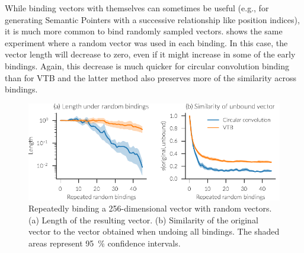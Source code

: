 While binding vectors with themselves can sometimes be useful (e.g., for generating Semantic Pointers with a successive relationship like position indices), it is much more common to bind randomly sampled vectors.
 shows the same experiment where a random vector was used in each binding.
In this case, the vector length will decrease to zero, even if it might increase in some of the early bindings.
Again, this decrease is much quicker for circular convolution binding than for VTB and the latter method also preserves more of the similarity across bindings.
\begin{figure}
    \centering
    \includegraphics{figures/bindings-random}
    \caption[Repeatedly binding a 256-dimensional vector with random vectors]{Repeatedly binding a 256-dimensional vector with random vectors. (a) Length of the resulting vector. (b) Similarity of the original vector to the vector obtained when undoing all bindings. The shaded areas represent \SI{95}{\percent} confidence intervals.}\label{fig:bindings-random}
\end{figure}

